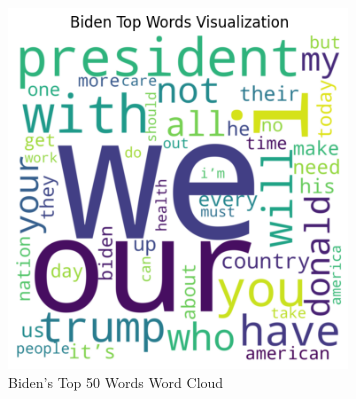 \documentclass{article}
\begin{document}
\begin{figure}[H]
    \centering
    \includegraphics[width=9cm]{BidenWordCloud50Crop.png}
    \caption{Biden's Top 50 Words Word Cloud}
    \label{fig:biden50}
\end{figure}
\end{document}
